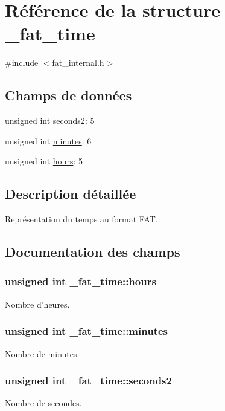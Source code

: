 \hypertarget{struct__fat__time}{\section{Référence de la structure \+\_\+fat\+\_\+time}
\label{struct__fat__time}
}


{\ttfamily \#include $<$fat\+\_\+internal.\+h$>$}

\subsection*{Champs de données}
\begin{DoxyCompactItemize}
\item 
unsigned int \hyperlink{struct__fat__time_ab02d4606058041887618d3b9beb92749}{seconds2}\+: 5
\item 
unsigned int \hyperlink{struct__fat__time_a92c31beaa1318e3ddf1457a57c30f1aa}{minutes}\+: 6
\item 
unsigned int \hyperlink{struct__fat__time_a7a3028be0bfed0b785e012d88c45f873}{hours}\+: 5
\end{DoxyCompactItemize}


\subsection{Description détaillée}
Représentation du temps au format F\+A\+T. 

\subsection{Documentation des champs}
\hypertarget{struct__fat__time_a7a3028be0bfed0b785e012d88c45f873}{
\subsubsection[{hours}]{\setlength{\rightskip}{0pt plus 5cm}unsigned int \+\_\+fat\+\_\+time\+::hours}}\label{struct__fat__time_a7a3028be0bfed0b785e012d88c45f873}
Nombre d'heures. \hypertarget{struct__fat__time_a92c31beaa1318e3ddf1457a57c30f1aa}{
\subsubsection[{minutes}]{\setlength{\rightskip}{0pt plus 5cm}unsigned int \+\_\+fat\+\_\+time\+::minutes}}\label{struct__fat__time_a92c31beaa1318e3ddf1457a57c30f1aa}
Nombre de minutes. \hypertarget{struct__fat__time_ab02d4606058041887618d3b9beb92749}{
\subsubsection[{seconds2}]{\setlength{\rightskip}{0pt plus 5cm}unsigned int \+\_\+fat\+\_\+time\+::seconds2}}\label{struct__fat__time_ab02d4606058041887618d3b9beb92749}
Nombre de secondes. 

